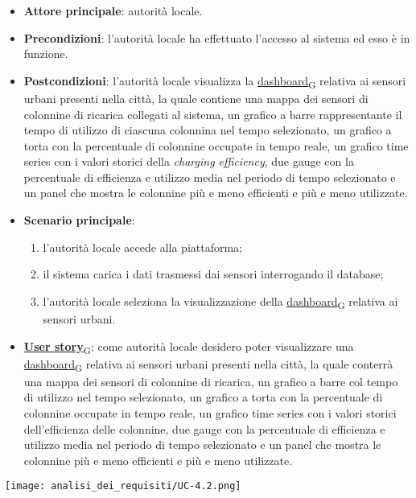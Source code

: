\newpage
{}
\begin{itemize}
	\item \textbf{Attore principale}: autorità locale.
	\item \textbf{Precondizioni}: l'autorità locale ha effettuato l'accesso al sistema ed esso è in funzione.
	\item \textbf{Postcondizioni}: l'autorità locale visualizza la \href{https://7last.github.io/docs/pb/documentazione-interna/glossario\#dashboard}{dashboard\textsubscript{G}} relativa ai sensori urbani presenti nella città, la quale contiene una mappa dei sensori di colonnine di ricarica collegati al sistema, un grafico a barre rappresentante il tempo di utilizzo di ciascuna colonnina nel tempo selezionato, un grafico a torta con la percentuale di colonnine occupate in tempo reale, un grafico time series con i valori storici della \textit{charging efficiency}, due gauge con la percentuale di efficienza e utilizzo media nel periodo di tempo selezionato e un panel che mostra le colonnine più e meno efficienti e più e meno utilizzate.
	\item \textbf{Scenario principale}:
	      \begin{enumerate}
		      \item l'autorità locale accede alla piattaforma;
		      \item il sistema carica i dati trasmessi dai sensori interrogando il database;
		      \item l'autorità locale seleziona la visualizzazione della \href{https://7last.github.io/docs/pb/documentazione-interna/glossario\#dashboard}{dashboard\textsubscript{G}} relativa ai sensori urbani.
	      \end{enumerate}
	\item \href{https://7last.github.io/docs/pb/documentazione-interna/glossario\#user-story}{\textbf{User story}\textsubscript{G}}:
	      come autorità locale desidero poter visualizzare una \href{https://7last.github.io/docs/pb/documentazione-interna/glossario\#dashboard}{dashboard\textsubscript{G}} relativa ai sensori urbani presenti nella città, la quale conterrà una mappa dei sensori di colonnine di ricarica, un grafico a barre col tempo di utilizzo nel tempo selezionato, un grafico a torta con la percentuale di colonnine occupate in tempo reale, un grafico time series con i valori storici dell'efficienza delle colonnine, due gauge con la percentuale di efficienza e utilizzo media nel periodo di tempo selezionato e un panel che mostra le colonnine più e meno efficienti e più e meno utilizzate.
\end{itemize}
\begin{center}
	\texttt{[image: analisi\_dei\_requisiti/UC-4.2.png]}
\end{center}

